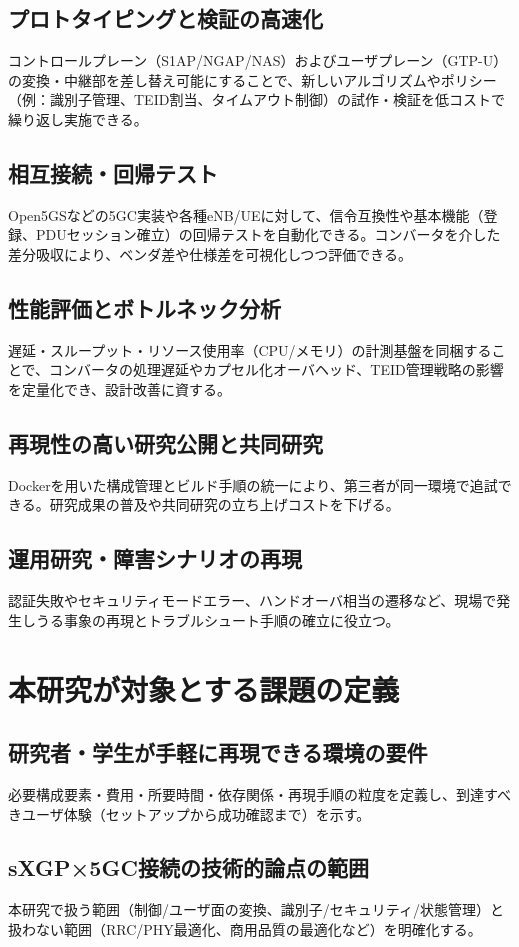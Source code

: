 \subsection{プロトタイピングと検証の高速化}
コントロールプレーン（S1AP/NGAP/NAS）およびユーザプレーン（GTP-U）の変換・中継部を差し替え可能にすることで、新しいアルゴリズムやポリシー（例：識別子管理、TEID割当、タイムアウト制御）の試作・検証を低コストで繰り返し実施できる。

\subsection{相互接続・回帰テスト}
Open5GSなどの5GC実装や各種eNB/UEに対して、信令互換性や基本機能（登録、PDUセッション確立）の回帰テストを自動化できる。コンバータを介した差分吸収により、ベンダ差や仕様差を可視化しつつ評価できる。

\subsection{性能評価とボトルネック分析}
遅延・スループット・リソース使用率（CPU/メモリ）の計測基盤を同梱することで、コンバータの処理遅延やカプセル化オーバヘッド、TEID管理戦略の影響を定量化でき、設計改善に資する。

\subsection{再現性の高い研究公開と共同研究}
Dockerを用いた構成管理とビルド手順の統一により、第三者が同一環境で追試できる。研究成果の普及や共同研究の立ち上げコストを下げる。

\subsection{運用研究・障害シナリオの再現}
認証失敗やセキュリティモードエラー、ハンドオーバ相当の遷移など、現場で発生しうる事象の再現とトラブルシュート手順の確立に役立つ。

\section{本研究が対象とする課題の定義}
\subsection{研究者・学生が手軽に再現できる環境の要件}
必要構成要素・費用・所要時間・依存関係・再現手順の粒度を定義し、到達すべきユーザ体験（セットアップから成功確認まで）を示す。
\subsection{sXGP×5GC接続の技術的論点の範囲}
本研究で扱う範囲（制御/ユーザ面の変換、識別子/セキュリティ/状態管理）と扱わない範囲（RRC/PHY最適化、商用品質の最適化など）を明確化する。

